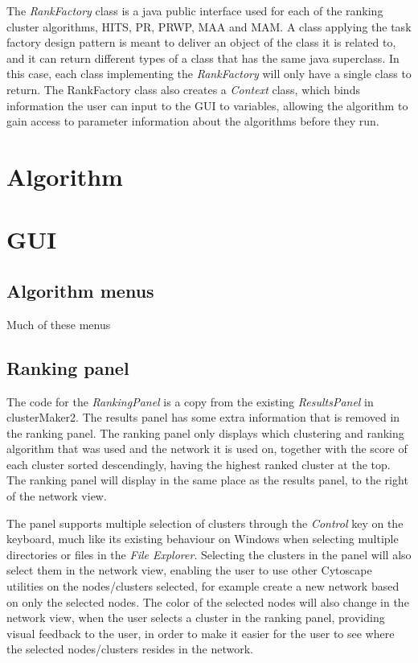 The \textit{RankFactory} class is a java public interface used for each of the
ranking cluster algorithms, HITS, PR, PRWP, MAA and MAM. A class applying the
task factory design pattern is meant to deliver an object of the class it is
related to\cite{factory-design}, and it can return different types of a class
that has the same java superclass\cite{java-superclass}. In this case, each
class implementing the \textit{RankFactory} will only have a single class to
return. The RankFactory class also creates a \textit{Context} class, which binds
information the user can input to the GUI to variables, allowing the algorithm
to gain access to parameter information about the algorithms before they run.

\section{Algorithm}
\section{GUI}
\subsection{Algorithm menus}
Much of these menus
\subsection{Ranking panel}
The code for the \textit{RankingPanel} is a copy from the existing
\textit{ResultsPanel} in clusterMaker2. The results panel has some extra
information that is removed in the ranking panel. The ranking panel only
displays which clustering and ranking algorithm that was used and the network it
is used on, together with the score of each cluster sorted descendingly, having
the highest ranked cluster at the top. The ranking panel will display in the
same place as the results panel, to the right of the network view.

The panel supports multiple selection of clusters through the \textit{Control}
key on the keyboard, much like its existing behaviour on Windows when selecting
multiple directories or files in the \textit{File Explorer}. Selecting the
clusters in the panel will also select them in the network view, enabling the
user to use other Cytoscape utilities on the nodes/clusters selected, for
example create a new network based on only the selected nodes. The color of the
selected nodes will also change in the network view, when the user selects a
cluster in the ranking panel, providing visual feedback to the user, in order to
make it easier for the user to see where the selected nodes/clusters resides in
the network.

